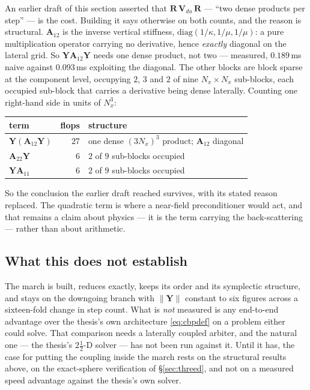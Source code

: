 \documentclass[11pt,a4paper]{article}
\newcommand{\bA}{\mathbf{A}}
\newcommand{\bV}{\mathbf{V}}
\newcommand{\bR}{\mathbf{R}}
\newcommand{\bY}{\mathbf{Y}}
\begin{document}
An earlier draft of this section asserted that
$\bR\,\bV_{du}\,\bR$ --- ``two dense products per step'' --- is the cost.
Building it says otherwise on both counts, and the reason is structural.
$\bA_{12}$ is the inverse vertical stiffness,
$\mathrm{diag}(1/\kappa,1/\mu,1/\mu)$: a pure multiplication operator carrying
no derivative, hence \emph{exactly} diagonal on the lateral grid.  So
$\bY\bA_{12}\bY$ needs one dense product, not two --- measured, $0.189$\,ms
naive against $0.093$\,ms exploiting the diagonal.  The other blocks are block
sparse at the component level, occupying $2$, $3$ and $2$ of nine $N_x\times
N_x$ sub-blocks, each occupied sub-block that carries a derivative being dense
laterally.  Counting one right-hand side in units of $N_x^{3}$:

\begin{center}
\begin{tabular}{@{}lrl@{}}
\toprule
term & flops & structure\\
\midrule
$\bY(\bA_{12}\bY)$ & $27$ & one dense $(3N_x)^3$ product; $\bA_{12}$ diagonal\\
$\bA_{22}\bY$      & $6$  & $2$ of $9$ sub-blocks occupied\\
$\bY\bA_{11}$      & $6$  & $2$ of $9$ sub-blocks occupied\\
\bottomrule
\end{tabular}
\end{center}

So the conclusion the earlier draft reached survives, with its stated reason
replaced.  The quadratic term is where a near-field preconditioner would act,
and that remains a claim about physics --- it is the term carrying the
back-scattering --- rather than about arithmetic.

\subsection{What this does not establish}

The march is built, reduces exactly, keeps its order and its symplectic
structure, and stays on the downgoing branch with $\|\bY\|$ constant to six
figures across a sixteen-fold change in step count.  What is \emph{not} measured
is any end-to-end advantage over the thesis's own architecture
\eqref{eq:cbpdef} on a problem either could solve.  That comparison needs a
laterally coupled arbiter, and the natural one --- the thesis's
$2\tfrac12$-D solver --- has not been run against it.  Until it has, the case
for putting the coupling inside the march rests on the structural results above,
on the exact-sphere verification of \S\ref{sec:threed}, and not on a measured
speed advantage against the thesis's own solver.
\end{document}
